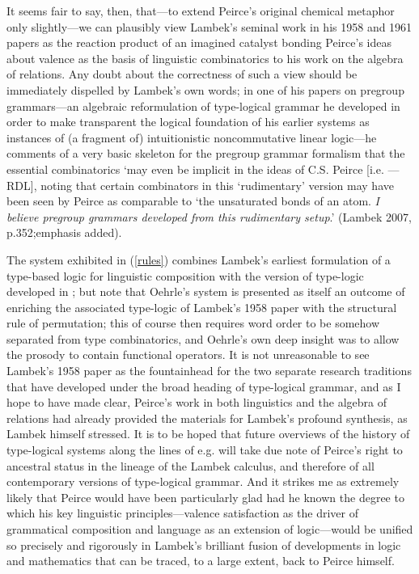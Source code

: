 \documentclass[output=paper,colorlinks,citecolor=brown]{langscibook}
\begin{document}
It seems fair to say, then, that---to extend Peirce's original
chemical metaphor only slightly---we can plausibly view Lambek's
seminal work in his 1958 and 1961 papers as the reaction product of an
imagined catalyst bonding Peirce's ideas about valence as the basis of
linguistic combinatorics to his work on the algebra of relations. Any
doubt about the correctness of such a view should be immediately
dispelled by Lambek's own words; in one of his papers on pregroup
grammars---an algebraic reformulation of type-logical grammar he
developed in order to make transparent the logical foundation of his
earlier systems as instances of (a fragment of) intuitionistic
noncommutative linear logic---he comments of a very basic skeleton for
the pregroup grammar formalism that the essential combinatorics `may
even be implicit in the ideas of C.S. Peirce [i.e. \citet{peirce1897}
---RDL], noting that certain combinators in this `rudimentary' version
may have been seen by Peirce as comparable to `the unsaturated bonds
of an atom. \textsl{I believe pregroup grammars developed from this
rudimentary setup}.' (Lambek 2007, p.352;\nocite{lambek2007a}emphasis added).

The system exhibited in (\ref{rules}) combines Lambek's earliest formulation
of a type-based logic for linguistic composition with the version of
type-logic developed in \citet{oehrle1994}; but note that Oehrle's system is
presented as itself an outcome of enriching the associated type-logic
of Lambek's 1958 paper with the structural rule of permutation; this
of course then requires word order to be somehow separated from type
combinatorics, and Oehrle's own deep insight was to allow the prosody
to contain functional operators. It is not unreasonable to see
Lambek's 1958 paper as the fountainhead for the two separate research
traditions that have developed under the broad heading of type-logical
grammar, and as I hope to have made clear, Peirce's work in both
linguistics and the algebra of relations had already provided the
materials for Lambek's profound synthesis, as Lambek himself stressed.
It is to be hoped that future overviews of the history of type-logical
systems along the lines of e.g. \citet{moortgat2010} will take due note of Peirce's right to
ancestral status in the lineage of the Lambek calculus, and therefore
of all contemporary versions of type-logical grammar. And it strikes
me as extremely likely that Peirce would have been
particularly glad had he known the degree to which his key
linguistic principles---valence satisfaction as the driver of
grammatical composition and language as an extension of logic---would
be unified so precisely and rigorously in Lambek's brilliant fusion
of developments in logic and mathematics that can be traced, to a large
extent, back to Peirce himself.
\end{document}
